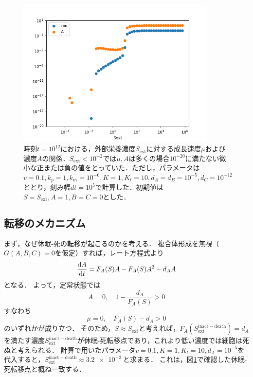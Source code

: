 \documentclass[a4paper,11pt]{jsarticle}
\begin{document}
\begin{figure}[htbp]
  \centering
  \includegraphics[width=10cm]{himeoka_trans.png}
  \caption{時刻$t=10^{12}$における，外部栄養濃度$S_{\mathrm{ext}}$に対する成長速度$\mu$および濃度$A$の関係．$S_{\mathrm{ext}}< 10^{-2}$では$\mu,A$は多くの場合$10^{-20}$に満たない微小な正または負の値をとっていた．ただし，パラメータは$v=0.1, k_p=1, k_m=10^{-6}, K=1, K_t=10, d_A=d_B=10^{-5},d_C=10^{-12}$ととり，刻み幅$dt=10^5$で計算した．初期値は$S=S_{\mathrm{ext}}, A=1, B=C=0$とした．}
  \label{fig:himeoka_trans}
\end{figure}

\subsection{転移のメカニズム}
まず，なぜ休眠-死の転移が起こるのかを考える．
複合体形成を無視（$G(A,B,C)=0$を仮定）すれば，レート方程式より
\begin{equation}
  \dv{A}{t} = F_A(S)A - F_A(S)A^2 - d_A A 
\end{equation}
となる．
よって，定常状態では
\begin{equation}
  A = 0,\quad 1 - \frac{d_A}{F_A(S)} >0
\end{equation}
すなわち
\begin{equation}
  \mu = 0,\quad F_A(S)-d_A >0
\end{equation}
のいずれかが成り立つ．
そのため，$S\approx S_{\mathrm{ext}}$と考えれば，$F_A(S^{\mathrm{inact-death}}_{\mathrm{ext}})=d_A$を満たす濃度$S^{\mathrm{inact-death}}_{\mathrm{ext}}$が休眠-死転移点であり，これより低い濃度では細胞は死ぬと考えられる．
計算で用いたパラメータ$v=0.1, K=1, K_t=10, d_A=10^{-5}$を代入すると，$S^{\mathrm{inact-death}}_{\mathrm{ext}}\approx \SI{3.2e-2}{}$と求まる．
これは，図\ref{fig:himeoka_trans}で確認した休眠-死転移点と概ね一致する．
\end{document}
